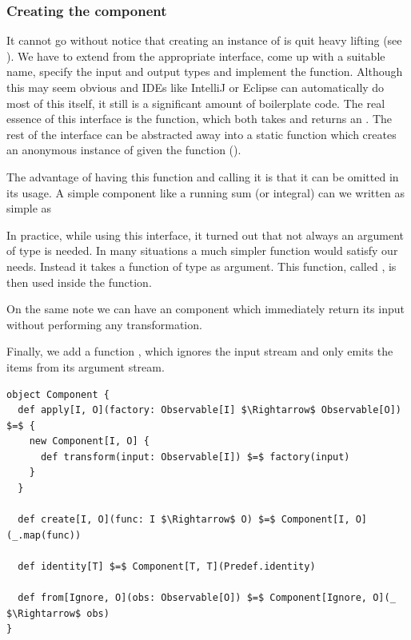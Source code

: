 \subsubsection{Creating the component}
It cannot go without notice that creating an instance of \comp is quit heavy lifting (see ). We have to extend from the appropriate interface, come up with a suitable name, specify the input and output types and implement the  function. Although this may seem obvious and IDEs like IntelliJ or Eclipse can automatically do most of this itself, it still is a significant amount of boilerplate code. The real essence of this interface is the  function, which both takes and returns an \obs. The rest of the interface can be abstracted away into a static function which creates an anonymous instance of \comp given the  function ().

The advantage of having this function and calling it  is that it can be omitted in its usage. A simple component like a running sum (or integral) can we written as simple as 

In practice, while using this interface, it turned out that not always an argument of type  is needed. In many situations a much simpler function would satisfy our needs. Instead it takes a function of type  as argument. This function, called , is then used inside the  function.

On the same note we can have an  component which immediately return its input without performing any transformation.

Finally, we add a function , which ignores the input stream and only emits the items from its argument stream.

\begin{minipage}{\linewidth}
\begin{lstlisting}[style=ScalaStyle, caption={Various ways to create a \comp}, label={lst:creating-component}]
object Component {
  def apply[I, O](factory: Observable[I] $\Rightarrow$ Observable[O]) $=$ {
    new Component[I, O] {
      def transform(input: Observable[I]) $=$ factory(input)
    }
  }

  def create[I, O](func: I $\Rightarrow$ O) $=$ Component[I, O](_.map(func))
  
  def identity[T] $=$ Component[T, T](Predef.identity)
  
  def from[Ignore, O](obs: Observable[O]) $=$ Component[Ignore, O](_ $\Rightarrow$ obs)
}
\end{lstlisting}
\end{minipage}


